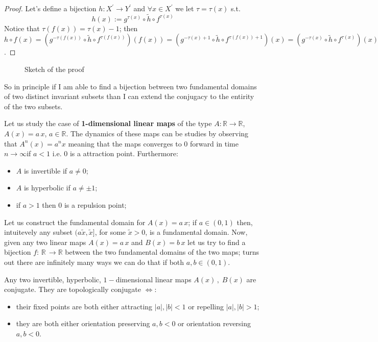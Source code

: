 \documentclass[../main.tex]{subfiles}
\begin{document}
\begin{proof}
     Let's define a bijection $h:X^{'}\to Y^{'}$ and $\forall x \in X^{'}$ we let $\tau = \tau(x)$ s.t. 
     \begin{equation*}          
             h(x):=g^{\tau(x)} \circ \tilde{h} \circ f^{\tau(x)}
     \end{equation*}
     Notice that $\tau(f(x))=\tau(x) -1$; then $h \circ f(x)= (g^{-\tau(f(x))}\circ\tilde{h}\circ f^{\tau(f(x))}) (f(x))= (g^{-\tau(x)+1}\circ\tilde{h}\circ f^{\tau(f(x))+1})(x) = (g^{-\tau(x)}\circ \tilde{h}\circ f^{\tau(x)})(x) = (g\circ g^{-\tau(x)}\circ\tilde{h}\circ f^{\tau(x)})(x)=g\circ h(x)$.
\end{proof}

     \begin{figure}[H]
         \centering 
         \caption{Sketch of the proof}
         \label{fig5}
     \end{figure}
So in principle if I am able to find a bijection between two fundamental domains of two distinct invariant subsets than I can extend the conjugacy to the entirity of the two subsets. 
\begin{example}[label=ex2]{}{}
     Let us study the case of \textbf{1-dimensional linear maps} of the type $A:\mathbb{R}\to \mathbb{R}$, $A(x)=a\,x$, $a\in \mathbb{R}$. The dynamics of these maps can be studies by observing that $A^{n}(x)=a^{n}x$ meaning that the maps converges to $0$ forward in time $n\to\infty$if $a<1$ i.e. $0$ is a attraction point. Furthermore:
     \begin{itemize}
          \item $A$ is invertible if $a\neq 0$;
          \item $A$ is hyperbolic if $a\neq \pm 1$;
          \item if $a>1$ then $0$ is a repulsion point;
     \end{itemize}
     Let us construct the fundamental domain for $A(x)=a\,x$; if $a\in(0,1)$ then, intuitevely any subset $(a \tilde{x},\tilde{x}]$, for some $\tilde{x}>0$, is a fundamental domain. 
     Now, given any two linear maps $A(x)=a\,x$ and $B(x)=b\,x$ let us try to find a bijection $f:\,\mathbb{R}\,\to \mathbb{R}$ between the two fundamental domains of the two maps; turns out there are infinitely many ways we can do that if both $a,b\in(0,1)$.
\end{example}
\begin{proposition*}
     Any two invertible, hyperbolic, $1-$dimensional linear maps $A(x)\,,\; B(x)$ are conjugate. They are topologically conjugate $\iff$:
     \begin{itemize}
          \item their fixed points are both either attracting $|a|,|b| < 1$ or repelling $|a|,|b| > 1$;
          \item they are both either orientation preserving  $a,b < 0$ or orientation reversing $a,b < 0$.
     \end{itemize}
\end{proposition*}
\end{document}
